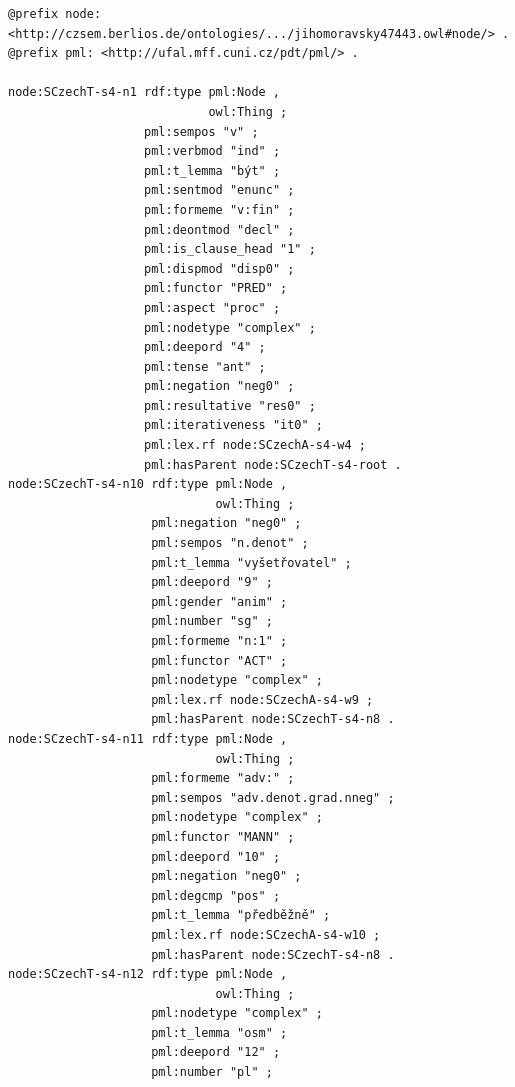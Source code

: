 \begin{listing}[ht]
\begin{verbatim}
@prefix node: <http://czsem.berlios.de/ontologies/.../jihomoravsky47443.owl#node/> .
@prefix pml: <http://ufal.mff.cuni.cz/pdt/pml/> .

node:SCzechT-s4-n1 rdf:type pml:Node ,
                            owl:Thing ;
                   pml:sempos "v" ;
                   pml:verbmod "ind" ;
                   pml:t_lemma "být" ;
                   pml:sentmod "enunc" ;
                   pml:formeme "v:fin" ;
                   pml:deontmod "decl" ;
                   pml:is_clause_head "1" ;
                   pml:dispmod "disp0" ;
                   pml:functor "PRED" ;
                   pml:aspect "proc" ;
                   pml:nodetype "complex" ;
                   pml:deepord "4" ;
                   pml:tense "ant" ;
                   pml:negation "neg0" ;
                   pml:resultative "res0" ;
                   pml:iterativeness "it0" ;
                   pml:lex.rf node:SCzechA-s4-w4 ;
                   pml:hasParent node:SCzechT-s4-root .
node:SCzechT-s4-n10 rdf:type pml:Node ,
                             owl:Thing ;
                    pml:negation "neg0" ;
                    pml:sempos "n.denot" ;
                    pml:t_lemma "vyšetřovatel" ;
                    pml:deepord "9" ;
                    pml:gender "anim" ;
                    pml:number "sg" ;
                    pml:formeme "n:1" ;
                    pml:functor "ACT" ;
                    pml:nodetype "complex" ;
                    pml:lex.rf node:SCzechA-s4-w9 ;
                    pml:hasParent node:SCzechT-s4-n8 .
node:SCzechT-s4-n11 rdf:type pml:Node ,
                             owl:Thing ;
                    pml:formeme "adv:" ;
                    pml:sempos "adv.denot.grad.nneg" ;
                    pml:nodetype "complex" ;
                    pml:functor "MANN" ;
                    pml:deepord "10" ;
                    pml:negation "neg0" ;
                    pml:degcmp "pos" ;
                    pml:t_lemma "předběžně" ;
                    pml:lex.rf node:SCzechA-s4-w10 ;
                    pml:hasParent node:SCzechT-s4-n8 .
node:SCzechT-s4-n12 rdf:type pml:Node ,
                             owl:Thing ;
                    pml:nodetype "complex" ;
                    pml:t_lemma "osm" ;
                    pml:deepord "12" ;
                    pml:number "pl" ;

\end{verbatim}
\end{listing}
